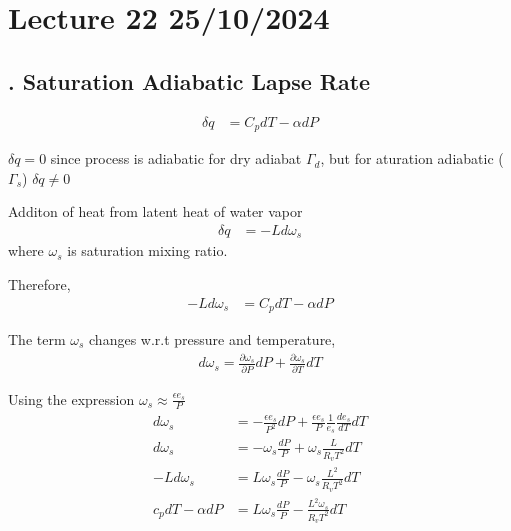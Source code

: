\documentclass[fleqn,10pt]{SelfArx} %
\begin{document}
\clearpage

\section{Lecture 22 25/10/2024}
\subsection{. Saturation Adiabatic Lapse Rate }
\begin{align}
    \delta q &= C_p dT - \alpha dP
\end{align}

$\delta q =0$ since process is adiabatic for dry adiabat $\Gamma_d$, but for aturation adiabatic ($\Gamma_s$) $\delta q \neq 0$

Additon of heat from latent heat of water vapor 
\begin{align}
    \delta q &= -Ld\omega_s
\end{align}
where $\omega_s$ is saturation mixing ratio.

Therefore,
\begin{align}
    -Ld\omega_s &= C_pdT - \alpha dP
\end{align}

The term $\omega_s$ changes w.r.t pressure and temperature,
\begin{align}
    d\omega_s = \frac{\partial \omega_s}{\partial P} dP +  \frac{\partial \omega_s}{\partial T} dT
\end{align}

Using the expression $\omega_s \approx \frac{\epsilon e_s}{P}$
\begin{align}
    d\omega_s &= -\frac{\epsilon e_s}{P^2} dP + \frac{\epsilon e_s}{P} \frac{1}{e_s}\frac{de_s}{dT}dT \\
    d\omega_s &= -\omega_s \frac{dP}{P} + \omega_s \frac{L}{R_v T^2}dT \\
    -Ld\omega_s &= L\omega_s\frac{dP}{P} - \omega_s \frac{L^2}{R_v T^2}dT \\
    c_pdT - \alpha dP &= L\omega_s \frac{dP}{P} - \frac{L^2\omega_s}{R_vT^2}dT
\end{align}
\end{document}

